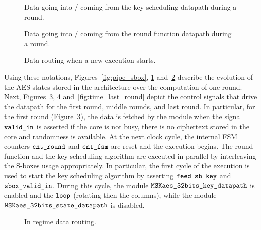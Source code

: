\documentclass{scrartcl}
\begin{document}
\begin{figure}
    \centering
    
    \caption{Data going into / coming from the key scheduling datapath during a round.}
    \label{fig:pipe_dpkey}
\end{figure}

\begin{figure}
    \centering
    
    \caption{Data going into / coming from the round function datapath during a round.}
    \label{fig:pipe_dpstate}
\end{figure}

\begin{figure}
    \centering
     
    \caption{Data routing when a new execution starts.}
    \label{fig:time_first_round}
\end{figure}

Using these notations, Figures~\ref{fig:pipe_sbox}, \ref{fig:pipe_dpkey}
and~\ref{fig:pipe_dpstate} describe the evolution of the AES states stored in
the architecture over the computation of one round.
Next, Figures~\ref{fig:time_first_round}, \ref{fig:time_regime}
and~\ref{fig:time_last_round} depict the control signals that drive the
datapath for the first round, middle rounds, and last round.
In particular, for the first round (Figure~\ref{fig:time_first_round}), the
data is fetched by the module when the signal $\texttt{valid\_in}$ is asserted if
the core is not busy, there is no ciphertext stored in the core and randomness
is available.
At the next clock cycle, the
internal FSM counters $\texttt{cnt\_round}$ and $\texttt{cnt\_fsm}$ are reset and the
execution begins. The round function and the key scheduling algorithm are
executed in parallel by interleaving the S-boxes usage appropriately. In
particular, the first cycle of the execution is used to start the key
scheduling algorithm by asserting $\texttt{feed\_sb\_key}$ and $\texttt{sbox\_valid\_in}$.
During this cycle, the module $\texttt{MSKaes\_32bits\_key\_datapath}$ is enabled and the
$\texttt{loop}$ (rotating then the columns), while the module $\texttt{MSKaes\_32bits\_state\_datapath}$
is disabled.
\begin{figure}
    \centering
     
    \caption{In regime data routing.}
    \label{fig:time_regime}
\end{figure}
\end{document}
